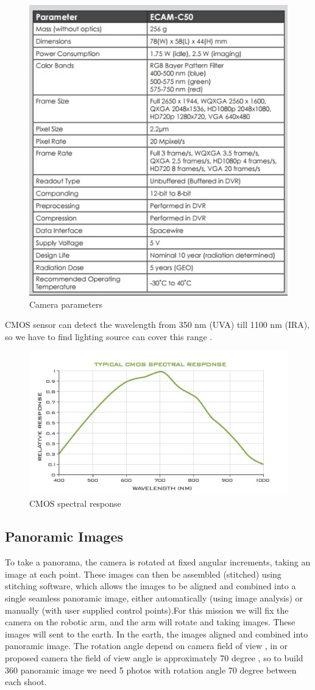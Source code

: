 \begin{figure}[htb]
\centering
\includegraphics[width=.48\textwidth]{figures/camera/bh10.jpg}
\caption{Camera parameters}
\end{figure}

CMOS sensor can detect the wavelength from 350 nm (UVA) till 1100 nm (IRA), so we have to find lighting source can cover this range .

\begin{figure}[htb]
\centering
\includegraphics[scale=1]{figures/camera/bh9.jpg}
\caption{CMOS spectral response}
\end{figure}

\subsection{Panoramic Images}

To take a panorama, the camera is rotated at fixed angular increments, taking an image at each point. These images can then be assembled (stitched) using stitching software, which allows the images to be aligned and combined into a single seamless panoramic image, either automatically (using image analysis) or manually (with user supplied control points).For this mission we will fix the camera on the robotic arm, and the arm will rotate and taking images. These images will sent to the earth. In the earth, the images aligned and combined into panoramic image.
The rotation angle depend on camera field of view , in or proposed camera the field of view angle is approximately 70 degree , so to build 360 panoramic image we need 5 photos with rotation angle 70 degree between each shoot.
